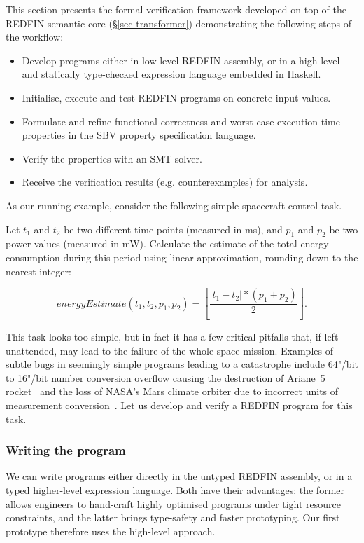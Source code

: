 
This section presents the formal verification framework developed on top of
the REDFIN semantic core (\S\ref{sec-transformer}) demonstrating the following
steps of the workflow:


\begin{itemize}
    \item Develop programs either in low-level REDFIN assembly, or in a high-level
    and statically type-checked expression language embedded in Haskell.
    \item Initialise, execute and test REDFIN programs on concrete input values.
    \item Formulate and refine functional correctness and worst case execution time
    properties in the SBV property specification language.
    \item Verify the properties with an SMT solver.
    \item Receive the verification results (e.g. counterexamples) for analysis.
\end{itemize}

\noindent
As our running example, consider the following simple spacecraft control task.


\begin{tcolorbox}

Let $t_1$ and $t_2$ be two different time points (measured in ms),
and $p_1$ and $p_2$ be two power values (measured in mW).
Calculate the estimate of the total energy consumption during this period
using linear approximation, rounding down to the nearest integer:

\[
\textit{energyEstimate}(t_1, t_2, p_1, p_2) = \left\lfloor \frac{|t_1 - t_2| * (p_1 + p_2)}{2} \right\rfloor.
\]

\end{tcolorbox}

\noindent
This task looks too simple, but in fact it has a few critical pitfalls that,
if left unattended, may lead to the failure of the whole space mission. Examples
of subtle bugs in seemingly simple programs leading to a catastrophe include 64"/bit
to 16"/bit number conversion overflow causing the destruction of Ariane~5
rocket~\cite{bug-rocket} and the loss of NASA's Mars climate orbiter due to incorrect
units of measurement conversion~\cite{NASA:1999:Mars}. Let us develop and verify
a REDFIN program for this task.


\subsubsection{Writing the program}
We can write programs either directly in the untyped REDFIN assembly, or in a
typed higher-level expression language. Both have their advantages: the former
allows engineers to hand-craft highly optimised programs under tight resource
constraints, and the latter brings type-safety and faster prototyping. Our first
prototype therefore uses the high-level approach.

